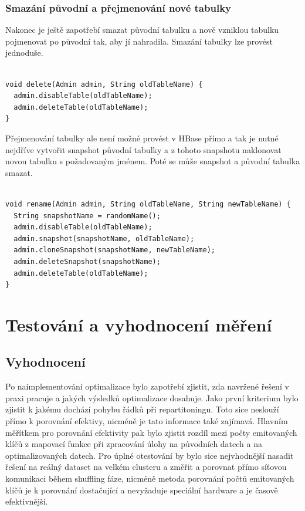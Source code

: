 \documentclass[thesis=M,czech]{FITthesis}[2012/06/26]
\begin{document}
\subsection{Smazání původní a přejmenování nové tabulky}
Nakonec je ještě zapotřebí smazat původní tabulku a nově vzniklou tabulku pojmenovat po původní tak, aby jí nahradila. Smazání tabulky lze provést jednoduše.
\begin{lstlisting}[frame=single]  % Start your code-block

void delete(Admin admin, String oldTableName) {
  admin.disableTable(oldTableName);
  admin.deleteTable(oldTableName);
}
\end{lstlisting}
 Přejmenování tabulky ale není možné provést v HBase přímo\cite{HBaseWEB} a tak je nutné nejdříve vytvořit snapshot původní tabulky a z tohoto snapshotu naklonovat novou tabulku s požadovaným jménem. Poté se může snapshot a původní tabulka smazat.

\begin{lstlisting}[frame=single]  % Start your code-block

void rename(Admin admin, String oldTableName, String newTableName) {
  String snapshotName = randomName();
  admin.disableTable(oldTableName);
  admin.snapshot(snapshotName, oldTableName);
  admin.cloneSnapshot(snapshotName, newTableName);
  admin.deleteSnapshot(snapshotName);
  admin.deleteTable(oldTableName);
}
\end{lstlisting}


\chapter{Testování a vyhodnocení měření}
\section{Vyhodnocení}
Po naimplementování optimalizace bylo zapotřebí zjistit, zda navržené řešení v praxi pracuje a jakých 
výsledků optimalizace dosahuje. Jako první kriterium bylo zjistit k jakému dochází pohybu řádků při repartitoningu. Toto sice neslouží přímo k porovnání efektivy, nicméně je tato informace také zajímavá. Hlavním měřítkem pro porovnání efektivity pak bylo zjistit rozdíl mezi počty emitovaných klíčů z mapovací funkce při zpracování úlohy na původních datech a na optimalizovaných datech. Pro úplné otestování by bylo sice nejvhodnější nasadit řešení na reálný dataset na velkém clusteru a změřit a porovnat přímo síťovou komunikaci během shuffling fáze, nicméně metoda porovnání počtů emitovaných klíčů je k porovnání dostačující a nevyžaduje speciální hardware a je časově efektivnější. 
\end{document}
